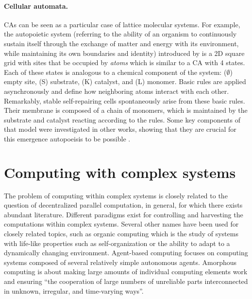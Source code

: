 \paragraph{Cellular automata.}
\Acfp{CA} can be seen as a particular case of lattice molecular systems. For
example, the autopoietic system (referring to the ability of an organism to continuously 
sustain itself through the exchange of matter and energy with its environment, 
while maintaining its own boundaries and identity) introduced by
\textcite{varelaAutopoiesisOrganizationLiving1991} is a 2D square grid with
sites that be occupied by \emph{atoms} which is similar to a \ac{CA} with 4
states. Each of these states is analogous to a chemical component of the system:
($\emptyset$) empty site, (S) substrate, (K) catalyst, and (L) monomer. Basic rules are
applied asynchronously and define how neighboring atoms interact with each
other. Remarkably, stable self-repairing cells spontaneously arise from these
basic rules. Their membrane is composed of a chain of monomers, which is
maintained by the substrate and catalyst reacting according to the rules. Some
key components of that model were investigated in other works, showing that they
are crucial for this emergence autopoeisis to be possible
\parencite{zelenySelforganizationLivingSystems1977,
  mcmullinRediscoveringComputationalAutopoiesis1997}.

\section{Computing with complex systems}\label{sec:comp-with-compl}

The problem of computing within complex systems is closely related to the
question of decentralized parallel computation, in general, for which there exists
abundant literature. Different paradigms exist for controlling and harvesting
the computations within complex systems. Several other names have been used for
closely related topics, such as organic computing
\parencite{muller-schloerOrganicComputingParadigm2011} which is the study of
systems with life-like properties such as self-organization or the ability to
adapt to a dynamically changing environment. Agent-based computing
\parencite{jenningsAgentBasedComputingPromise1999} focuses on computing systems
composed of several relatively simple autonomous agents. Amorphous computing
\parencite{abelsonAmorphousComputing2000,
  nagpalProgrammablePatternFormationScaleIndependence2008,
  nagpalProgrammableSelfassemblyUsing2002} is about making large amounts of
individual computing elements work and ensuring ``the cooperation of large
numbers of unreliable parts interconnected in unknown, irregular, and
time-varying ways''.

